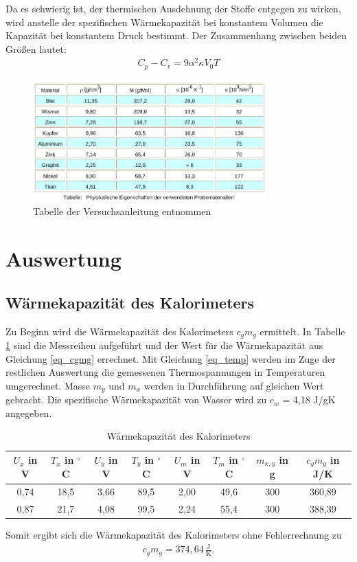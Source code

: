 Da es schwierig ist, der thermischen Ausdehnung der Stoffe entgegen zu wirken, wird anstelle der spezifischen Wärmekapazität bei konstantem Volumen die Kapazität bei konstantem Druck bestimmt. Der Zusammenhang zwischen beiden Größen lautet:
\begin{align}
C_p - C_v = 9 \alpha^2 \kappa V_0 T
\label{eq_molwaerme}
\end{align}
\begin{figure}[h]
\includegraphics[width=0.8\textwidth]{pics/litwerte.jpg}
\caption{Tabelle der Versuchsanleitung entnommen}
\label{pic_const}
\end{figure}


\section{Auswertung}
\subsection{Wärmekapazität des Kalorimeters}
\label{sec_kalorimeter}
Zu Beginn wird die Wärmekapazität des Kalorimeters $c_g m_g$ ermittelt. In Tabelle \ref{tab_cgmg} sind die Messreihen aufgeführt und der
Wert für die Wärmekapazität aus Gleichung \eqref{eq_cgmg} errechnet. Mit Gleichung \eqref{eq_temp} werden im Zuge der restlichen 
Auswertung die gemessenen Thermospannungen in Temperaturen umgerechnet. Masse $m_y$ und $m_x$ werden in Durchführung auf gleichen Wert
gebracht. Die spezifische Wärmekapazität von Wasser wird zu $c_w$ = 4,18 J/gK angegeben.
\begin{table}[H]
 \begin{tabular}{c|c|c|c|c|c|c|c}
 $U_x$ in V & $T_x$ in $^\circ$C & $U_y$ in V & $T_y$ in $^\circ$C & $U_m$ in V & $T_m$ in $^\circ$C & $m_{x,y}$ in g & $c_g m_g$ in J/K\\
 \hline
0,74&	18,5&	3,66&	89,5&	2,00&	49,6&	300&	360,89\\
0,87&	21,7&	4,08&	99,5&	2,24&	55,4&	300&	388,39\\
 \end{tabular}
\caption{Wärmekapazität des Kalorimeters}
\label{tab_cgmg}
\end{table}
Somit ergibt sich die Wärmekapazität des Kalorimeters ohne Fehlerrechnung zu 
\begin{align}
c_g m_g = 374,64 \, \frac{\text{J}}{\text{K}}.
\end{align}

